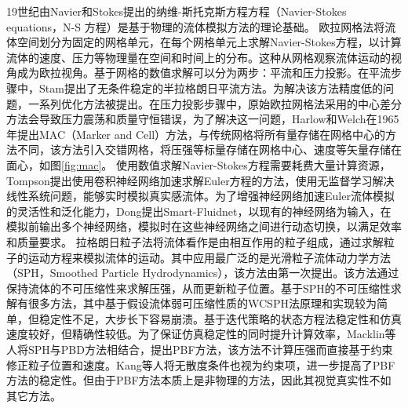 \newline
\indent 19世纪由Navier和Stokes提出的纳维-斯托克斯方程方程（Navier-Stokes equations，N-S 方程）是基于物理的流体模拟方法的理论基础\cite{constantin1988navier}。
欧拉网格法\cite{chen2020extended}将流体空间划分为固定的网格单元，在每个网格单元上求解Navier-Stokes方程，以计算流体的速度、压力等物理量在空间和时间上的分布。这种从网格观察流体运动的视角成为欧拉视角。基于网格的数值求解可以分为两步：平流和压力投影\cite{chorin1968numerical}。在平流步骤中，Stam\cite{stam2023stable}提出了无条件稳定的半拉格朗日平流方法。为解决该方法精度低的问题，一系列优化方法被提出\cite{selle2008unconditionally, qu2019efficient, molemaker2008low}。在压力投影步骤中，原始欧拉网格法采用的中心差分方法会导致压力震荡和质量守恒错误，为了解决这一问题，Harlow和Welch\cite{harlow1962particle}在1965年提出MAC（Marker and Cell）方法，与传统网格将所有量存储在网格中心的方法不同，该方法引入交错网格，将压强等标量存储在网格中心、速度等矢量存储在面心，如图\ref{fig:mac}。
\newline
\indent 使用数值求解Navier-Stokes方程需要耗费大量计算资源，Tompson\cite{tompson2017accelerating}提出使用卷积神经网络加速求解Euler方程的方法，使用无监督学习解决线性系统问题，能够实时模拟真实感流体。为了增强神经网络加速Euler流体模拟的灵活性和泛化能力，Dong\cite{dong2019adaptive}提出Smart-Fluidnet，以现有的神经网络为输入，在模拟前输出多个神经网络，模拟时在这些神经网络之间进行动态切换，以满足效率和质量要求。
\newline
\indent 拉格朗日粒子法将流体看作是由相互作用的粒子组成，通过求解粒子的运动方程来模拟流体的运动。其中应用最广泛的是光滑粒子流体动力学方法（SPH，Smoothed Particle Hydrodynamics），该方法由\cite{monaghan2005smoothed}第一次提出。该方法通过保持流体的不可压缩性来求解压强，从而更新粒子位置。基于SPH的不可压缩性求解有很多方法，其中基于假设流体弱可压缩性质的WCSPH法\cite{becker2007weakly}原理和实现较为简单，但稳定性不足，大步长下容易崩溃。基于迭代策略的状态方程法\cite{bender2015divergence}稳定性和仿真速度较好，但精确性较低。为了保证仿真稳定性的同时提升计算效率，Macklin等人将SPH与PBD方法相结合，提出PBF\cite{macklin2013position}方法，该方法不计算压强而直接基于约束修正粒子位置和速度。Kang等人\cite{kang2014incompressible}将无散度条件也视为约束项，进一步提高了PBF方法的稳定性。但由于PBF方法本质上是非物理的方法，因此其视觉真实性不如其它方法。




